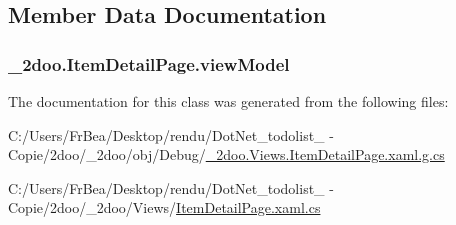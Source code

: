 \subsection{Member Data Documentation}
\hypertarget{class__2doo_1_1_item_detail_page_4e42bad0d16168025caaaed945451a8d}{
\subsubsection[{viewModel}]{ {\bf \_\-2doo.ItemDetailPage.viewModel}}}
\label{class__2doo_1_1_item_detail_page_4e42bad0d16168025caaaed945451a8d}




The documentation for this class was generated from the following files:\begin{CompactItemize}
\item 
C:/Users/FrBea/Desktop/rendu/DotNet\_\-todolist\_ - Copie/2doo/\_\-2doo/obj/Debug/\hyperlink{__2doo_8_views_8_item_detail_page_8xaml_8g_8cs}{\_\-2doo.Views.ItemDetailPage.xaml.g.cs}\item 
C:/Users/FrBea/Desktop/rendu/DotNet\_\-todolist\_ - Copie/2doo/\_\-2doo/Views/\hyperlink{_item_detail_page_8xaml_8cs}{ItemDetailPage.xaml.cs}\end{CompactItemize}
